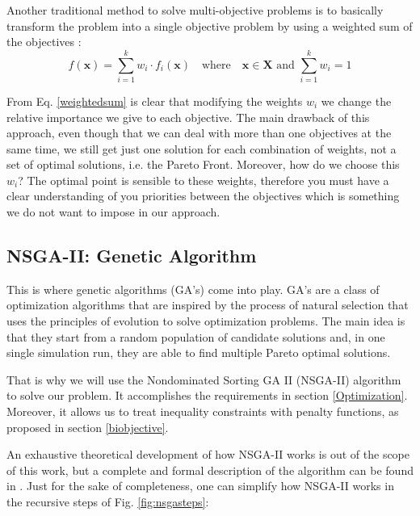 \documentclass[a4paper,11pt, titlepage, twoside]{article}
\begin{document}
Another traditional method to solve multi-objective problems is to basically transform the problem into a single objective problem by using a weighted sum of the objectives \cite{nsgai}:
\begin{equation}\label{weightedsum}
    f(\mathbf{x}) = \sum_{i=1}^{k} w_i \cdot f_i(\mathbf{x}) \quad \text{where} \quad \mathbf{x} \in \mathbf{X} \text{ and } \sum_{i=1}^{k} w_i = 1
\end{equation}

From Eq. \ref{weightedsum} is clear that modifying the weights $w_i$ we change the relative importance we give to each objective. The main drawback of this approach, even though that we can deal with more than one objectives at the same time, we
still get just one solution for each combination of weights, not a set of optimal solutions, i.e. the Pareto Front. Moreover, how do we choose this $w_i$? The optimal point is sensible to these weights, therefore you must have
a clear understanding of you priorities between the objectives which is something we do not want to impose in our approach.\par

\subsection{NSGA-II: Genetic Algorithm}\label{NSGAII}



This is where genetic algorithms (GA's) come into play. GA's are a class of optimization algorithms that are inspired by the process of natural selection that uses the principles of evolution to solve optimization problems. The main idea is that they start from a random
population of candidate solutions and, in one single simulation run, they are able to find multiple Pareto optimal solutions. \par

That is why we will use the Nondominated Sorting GA II (NSGA-II) algorithm to solve our problem. It accomplishes the requirements in  section \ref{Optimization}.
Moreover, it allows us to treat inequality constraints with penalty functions, as proposed in section \ref{biobjective}.\par

An exhaustive theoretical development of how NSGA-II works is out of the scope of this work, but a complete and formal description of the algorithm can be found in \cite{NSGAII}. Just for the sake of completeness, one can simplify how NSGA-II works in the recursive steps of Fig. \ref{fig:nsgasteps}:
\end{document}
